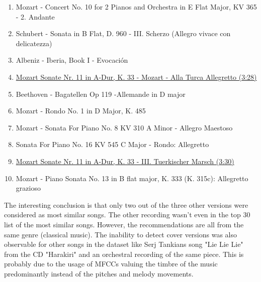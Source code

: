 \begin{enumerate}
	\setlength\itemsep{-0.5em}
	\item Mozart - Concert No. 10 for 2 Pianos and Orchestra in E Flat Major, KV 365 - 2. Andante
	\item Schubert - Sonata in B Flat, D. 960 - III. Scherzo (Allegro vivace con delicatezza)
	\item Albeniz - Iberia, Book I - Evocaci\'on
	\item \underline{Mozart Sonate Nr. 11 in A-Dur, K. 33 - Mozart - Alla Turca Allegretto (3:28)}
	\item Beethoven - Bagatellen Op 119 -Allemande in D major
	\item Mozart - Rondo No. 1 in D Major, K. 485
	\item Mozart - Sonata For Piano No. 8 KV 310 A Minor - Allegro Maestoso
	\item Sonata For Piano No. 16 KV 545 C Major - Rondo: Allegretto
	\item \underline{Mozart Sonate Nr. 11 in A-Dur, K. 33 - III. Tuerkischer Marsch (3:30)}
	\item Mozart - Piano Sonata No. 13 in B flat major, K. 333 (K. 315c): Allegretto grazioso
	
\end{enumerate}
\noindent The interesting conclusion is that only two out of the three other versions were considered as most similar songs. The other recording wasn't even in the top 30 list of the most similar songs. However, the recommendations are all from the same genre (classical music). The inability to detect cover versions was also observable for other songs in the dataset like Serj Tankians song "Lie Lie Lie" from the CD "Harakiri" and an orchestral recording of the same piece. This is probably due to the usage of MFCCs valuing the timbre of the music predominantly instead of the pitches and melody movements. 

